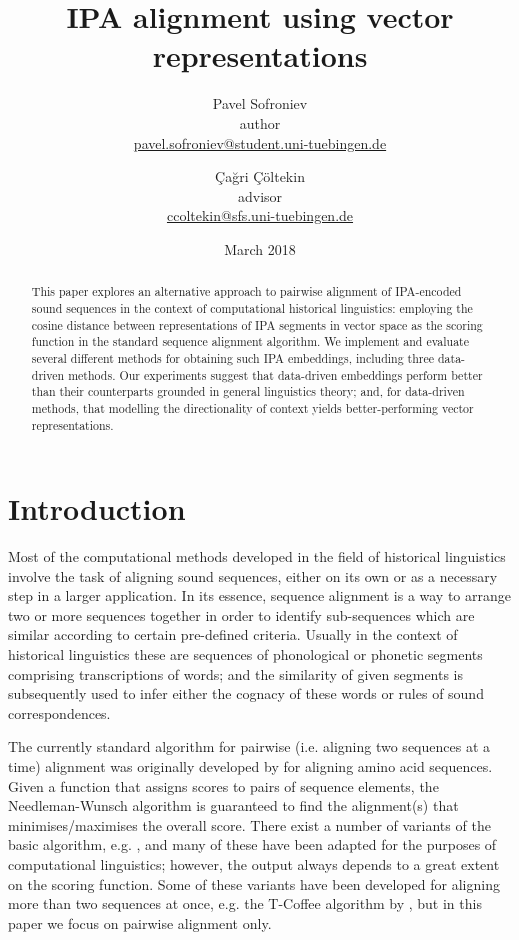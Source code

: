 \documentclass[a4paper]{report}
\begin{document}
\title{IPA alignment using vector representations}
\author{
	Pavel Sofroniev \\ \normalsize{author} \\ \normalsize\url{pavel.sofroniev@student.uni-tuebingen.de}\medskip
	\and
	Çağri Çöltekin \\ \normalsize{advisor} \\ \normalsize\url{ccoltekin@sfs.uni-tuebingen.de}\bigskip
}
\date{March 2018}
\maketitle

\begin{abstract}
	This paper explores an alternative approach to pairwise alignment of IPA-encoded sound sequences in the context of computational historical linguistics:
	employing the cosine distance between representations of IPA segments in vector space as the scoring function in the standard sequence alignment algorithm.
	We implement and evaluate several different methods for obtaining such IPA embeddings, including three data-driven methods.
	Our experiments suggest that data-driven embeddings perform better than their counterparts grounded in general linguistics theory;
	and, for data-driven methods, that modelling the directionality of context yields better-performing vector representations.
\end{abstract}


\chapter{Introduction}

Most of the computational methods developed in the field of historical linguistics involve the task of aligning sound sequences,
either on its own or as a necessary step in a larger application.
In its essence, sequence alignment is a way to arrange two or more sequences together
in order to identify sub-sequences which are similar according to certain pre-defined criteria.
Usually in the context of historical linguistics these are sequences of phonological or phonetic segments comprising transcriptions of words;
and the similarity of given segments is subsequently used to infer either the cognacy of these words or rules of sound correspondences.

The currently standard algorithm for pairwise (i.e. aligning two sequences at a time) alignment
was originally developed by \citet{1970_Needleman_Wunsch} for aligning amino acid sequences.
Given a function that assigns scores to pairs of sequence elements,
the Needleman-Wunsch algorithm is guaranteed to find the alignment(s) that minimises/maximises the overall score.
There exist a number of variants of the basic algorithm, e.g. \citet{1981_Smith_Waterman},
and many of these have been adapted for the purposes of computational linguistics;
however, the output always depends to a great extent on the scoring function.
Some of these variants have been developed for aligning more than two sequences at once,
e.g. the T-Coffee algorithm by \citet{2000_Notredame_al}, but in this paper we focus on pairwise alignment only.
\end{document}
